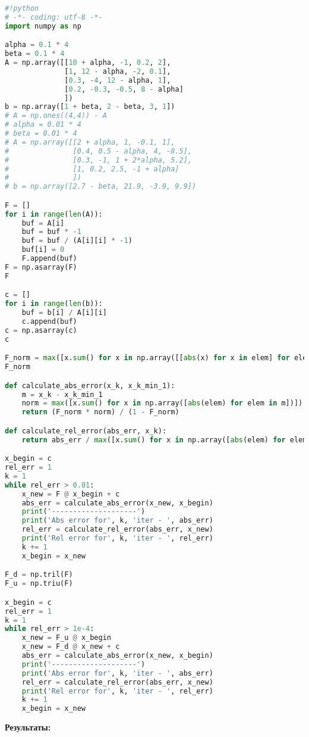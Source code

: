 \documentclass [12pt]{article}
\begin{document}
\begin{lstlisting}[language=python]
#!python
# -*- coding: utf-8 -*-
import numpy as np

alpha = 0.1 * 4
beta = 0.1 * 4
A = np.array([[10 + alpha, -1, 0.2, 2],
              [1, 12 - alpha, -2, 0.1],
              [0.3, -4, 12 - alpha, 1],
              [0.2, -0.3, -0.5, 8 - alpha]
              ])
b = np.array([1 + beta, 2 - beta, 3, 1])
# A = np.ones((4,4)) - A
# alpha = 0.01 * 4
# beta = 0.01 * 4
# A = np.array([[2 + alpha, 1, -0.1, 1],
#               [0.4, 0.5 - alpha, 4, -8.5],
#               [0.3, -1, 1 + 2*alpha, 5.2],
#               [1, 0.2, 2.5, -1 + alpha]
#               ])
# b = np.array([2.7 - beta, 21.9, -3.9, 9.9])

F = []
for i in range(len(A)):
    buf = A[i]
    buf = buf * -1
    buf = buf / (A[i][i] * -1)
    buf[i] = 0
    F.append(buf)
F = np.asarray(F)
F

c = []
for i in range(len(b)):
    buf = b[i] / A[i][i]
    c.append(buf)
c = np.asarray(c)
c

F_norm = max([x.sum() for x in np.array([[abs(x) for x in elem] for elem in F])])
F_norm

def calculate_abs_error(x_k, x_k_min_1):
    m = x_k - x_k_min_1
    norm = max([x.sum() for x in np.array([abs(elem) for elem in m])])
    return (F_norm * norm) / (1 - F_norm)

def calculate_rel_error(abs_err, x_k):
    return abs_err / max([x.sum() for x in np.array([abs(elem) for elem in x_k])])

x_begin = c 
rel_err = 1
k = 1
while rel_err > 0.01:
    x_new = F @ x_begin + c
    abs_err = calculate_abs_error(x_new, x_begin)
    print('--------------------')
    print('Abs error for', k, 'iter - ', abs_err)
    rel_err = calculate_rel_error(abs_err, x_new)
    print('Rel error for', k, 'iter - ', rel_err)
    k += 1
    x_begin = x_new

F_d = np.tril(F)
F_u = np.triu(F)

x_begin = c 
rel_err = 1
k = 1
while rel_err > 1e-4:
    x_new = F_u @ x_begin
    x_new = F_d @ x_new + c
    abs_err = calculate_abs_error(x_new, x_begin)
    print('--------------------')
    print('Abs error for', k, 'iter - ', abs_err)
    rel_err = calculate_rel_error(abs_err, x_new)
    print('Rel error for', k, 'iter - ', rel_err)
    k += 1
    x_begin = x_new

\end{lstlisting}

\textbf{Результаты:}
\end{document}
